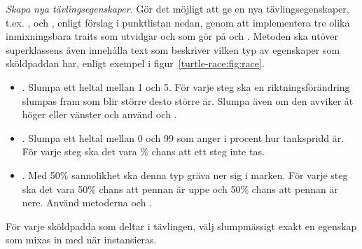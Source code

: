 \Task \emph{Skapa nya tävlingsegenskaper.} Gör det möjligt att ge en  nya tävlingsegenskaper, t.ex. ,  och , enligt förslag i punktlistan nedan, genom att implementera tre olika inmixningsbara traits som utvidgar  och som gör  på  och . Metoden  ska utöver superklassens  även innehålla text som beskriver vilken typ av egenskaper som sköldpaddan har, enligt exempel i figur~\ref{turtle-race:fig:race}.

\begin{itemize}

\item {}. Slumpa ett heltal  mellan 1 och 5. För varje steg ska en riktningsförändring slumpas fram som blir större desto större  är. Slumpa även om den avviker åt höger eller vänster och använd  och .

\item {}. Slumpa ett heltal  mellan 0 och 99 som anger i procent hur tankspridd  är. För varje steg ska det vara \% chans att ett steg inte tas.

\item {}. Med 50\% sannolikhet ska denna typ  gräva ner sig i marken. För varje steg ska det vara 50\% chans att pennan är uppe och 50\% chans att pennan är nere. Använd metoderna  och .

\end{itemize}

\noindent För varje sköldpadda som deltar i tävlingen, välj slumpmässigt exakt en egenskap som mixas in med  när  instansieras.

